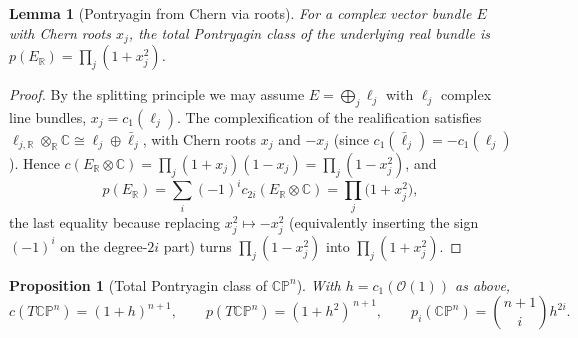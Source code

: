 \documentclass[12pt]{article}
\newtheorem{lemma}{Lemma}
\newtheorem{proposition}{Proposition}
\theoremstyle{definition}
\begin{document}
\begin{lemma}[Pontryagin from Chern via roots]\label{lem:pfromc}
For a complex vector bundle $E$ with Chern roots $x_j$, the total Pontryagin class of the
underlying real bundle is $p(E_{\mathbb{R}})=\prod_j(1+x_j^2)$.
\end{lemma}

\begin{proof}
By the splitting principle we may assume $E=\bigoplus_j \ell_j$ with $\ell_j$ complex line
bundles, $x_j=c_1(\ell_j)$.  The complexification of the realification satisfies
$\ell_{j,\mathbb{R}}\otimes_{\mathbb{R}}\mathbb{C}\cong \ell_j\oplus\bar\ell_j$, with Chern
roots $x_j$ and $-x_j$ (since $c_1(\bar\ell_j)=-c_1(\ell_j)$).  Hence
$c(E_{\mathbb{R}}\otimes\mathbb{C})=\prod_j(1+x_j)(1-x_j)=\prod_j(1-x_j^2)$, and
\[
p(E_{\mathbb{R}})=\sum_i (-1)^i c_{2i}(E_{\mathbb{R}}\otimes\mathbb{C})
=\prod_j\big(1+x_j^2\big),
\]
the last equality because replacing $x_j^2\mapsto -x_j^2$ (equivalently inserting the sign
$(-1)^i$ on the degree-$2i$ part) turns $\prod_j(1-x_j^2)$ into $\prod_j(1+x_j^2)$.
\end{proof}

\begin{proposition}[Total Pontryagin class of $\mathbb{CP}^n$]\label{prop:cppont}
With $h=c_1(\mathcal{O}(1))$ as above,
\[
c(T\mathbb{CP}^n)=(1+h)^{n+1},
\qquad
p(T\mathbb{CP}^n)=(1+h^2)^{\,n+1},
\qquad
p_i(\mathbb{CP}^n)=\binom{n+1}{i}h^{2i}.
\]
\end{proposition}
\end{document}
